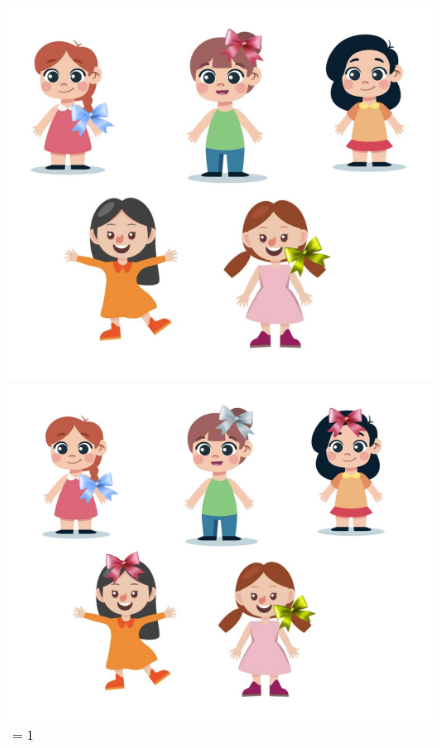 \documentclass[a4paper, 12pt]{article}
\begin{document}
\begin{figure}[!htb]
    \begin{minipage}{0.32\textwidth}
        \includegraphics[width=\linewidth]{images/bows_0.png}
        \caption{$\le 1$}
    \end{minipage}\hfill
    \begin{minipage}{0.32\textwidth}
        \includegraphics[width=\linewidth]{images/bows_1.png}
        \caption{$= 1$}
    \end{minipage}\hfill
    \begin{minipage}{0.32\textwidth}

\end{minipage}
\end{figure}
\end{document}
